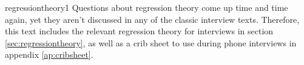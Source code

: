 \begin{answer}{regressiontheory1}
Questions about regression theory come up time and time again, yet they aren't discussed in any of the classic interview texts.
Therefore, this text includes the relevant regression theory for interviews in section \ref{sec:regressiontheory}, as well as a crib sheet to use during phone interviews in
appendix \ref{ap:cribsheet}.
\end{answer}
